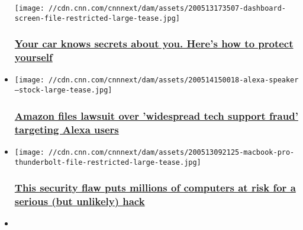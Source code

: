 \begin{itemize}
  \texttt{[image: //cdn.cnn.com/cnnnext/dam/assets/200513173507-dashboard-screen-file-restricted-large-tease.jpg]}

  \hypertarget{your-car-knows-secrets-about-you-heres-how-to-protect-yourself}{%
  \subsubsection{\texorpdfstring{\href{/2020/05/18/tech/car-data-safety/index.html}{Your
  car knows secrets about you. Here's how to protect
  yourself}}{Your car knows secrets about you. Here's how to protect yourself}}\label{your-car-knows-secrets-about-you-heres-how-to-protect-yourself}}
\item
  \href{/2020/05/15/tech/amazon-alexa-tech-support-fraud/index.html}{}

  \texttt{[image: //cdn.cnn.com/cnnnext/dam/assets/200514150018-alexa-speaker---stock-large-tease.jpg]}

  \hypertarget{amazon-files-lawsuit-over-widespread-tech-support-fraud-targeting-alexa-users}{%
  \subsubsection{\texorpdfstring{\href{/2020/05/15/tech/amazon-alexa-tech-support-fraud/index.html}{Amazon
  files lawsuit over 'widespread tech support fraud' targeting Alexa
  users}}{Amazon files lawsuit over 'widespread tech support fraud' targeting Alexa users}}\label{amazon-files-lawsuit-over-widespread-tech-support-fraud-targeting-alexa-users}}
\item
  \href{/2020/05/12/tech/intel-thunderbolt-security-vulnerability/index.html}{}

  \texttt{[image: //cdn.cnn.com/cnnnext/dam/assets/200513092125-macbook-pro-thunderbolt-file-restricted-large-tease.jpg]}

  \hypertarget{this-security-flaw-puts-millions-of-computers-at-risk-for-a-serious-but-unlikely-hack}{%
  \subsubsection{\texorpdfstring{\href{/2020/05/12/tech/intel-thunderbolt-security-vulnerability/index.html}{This
  security flaw puts millions of computers at risk for a serious (but
  unlikely)
  hack}}{This security flaw puts millions of computers at risk for a serious (but unlikely) hack}}\label{this-security-flaw-puts-millions-of-computers-at-risk-for-a-serious-but-unlikely-hack}}
\item
\end{itemize}

